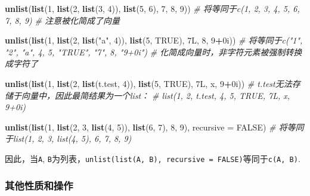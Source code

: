 \documentclass[]{book}
\newenvironment{Shaded}{\begin{snugshade}}{\end{snugshade}}
\newcommand{\CommentTok}[1]{\textcolor[rgb]{0.56,0.35,0.01}{\textit{#1}}}
\newcommand{\DataTypeTok}[1]{\textcolor[rgb]{0.13,0.29,0.53}{#1}}
\newcommand{\DecValTok}[1]{\textcolor[rgb]{0.00,0.00,0.81}{#1}}
\newcommand{\KeywordTok}[1]{\textcolor[rgb]{0.13,0.29,0.53}{\textbf{#1}}}
\newcommand{\NormalTok}[1]{#1}
\newcommand{\OperatorTok}[1]{\textcolor[rgb]{0.81,0.36,0.00}{\textbf{#1}}}
\newcommand{\OtherTok}[1]{\textcolor[rgb]{0.56,0.35,0.01}{#1}}
\newcommand{\StringTok}[1]{\textcolor[rgb]{0.31,0.60,0.02}{#1}}
\begin{document}
\begin{Shaded}
\begin{Highlighting}[]
\KeywordTok{unlist}\NormalTok{(}\KeywordTok{list}\NormalTok{(}\DecValTok{1}\NormalTok{, }\KeywordTok{list}\NormalTok{(}\DecValTok{2}\NormalTok{, }\KeywordTok{list}\NormalTok{(}\DecValTok{3}\NormalTok{, }\DecValTok{4}\NormalTok{)), }\KeywordTok{list}\NormalTok{(}\DecValTok{5}\NormalTok{, }\DecValTok{6}\NormalTok{), }\DecValTok{7}\NormalTok{, }\DecValTok{8}\NormalTok{, }\DecValTok{9}\NormalTok{))}
\CommentTok{# 将等同于c(1, 2, 3, 4, 5, 6, 7, 8, 9) }
\CommentTok{# 注意被化简成了向量}

\KeywordTok{unlist}\NormalTok{(}\KeywordTok{list}\NormalTok{(}\DecValTok{1}\NormalTok{, }\KeywordTok{list}\NormalTok{(}\DecValTok{2}\NormalTok{, }\KeywordTok{list}\NormalTok{(}\StringTok{"a"}\NormalTok{, }\DecValTok{4}\NormalTok{)), }\KeywordTok{list}\NormalTok{(}\DecValTok{5}\NormalTok{, }\OtherTok{TRUE}\NormalTok{), 7L, }\DecValTok{8}\NormalTok{, }\DecValTok{9}\OperatorTok{+}\NormalTok{0i))}
\CommentTok{# 将等同于c("1", "2", "a", 4, 5, "TRUE", "7", 8, "9+0i")}
\CommentTok{# 化简成向量时，非字符元素被强制转换成字符了}

\KeywordTok{unlist}\NormalTok{(}\KeywordTok{list}\NormalTok{(}\DecValTok{1}\NormalTok{, }\KeywordTok{list}\NormalTok{(}\DecValTok{2}\NormalTok{, }\KeywordTok{list}\NormalTok{(t.test, }\DecValTok{4}\NormalTok{)), }\KeywordTok{list}\NormalTok{(}\DecValTok{5}\NormalTok{, }\OtherTok{TRUE}\NormalTok{), 7L, x, }\DecValTok{9}\OperatorTok{+}\NormalTok{0i))}
\CommentTok{# t.test无法存储于向量中，因此最简结果为一个list：}
\CommentTok{# list(1, 2, t.test, 4, 5, TRUE, 7L, x, 9+0i)}


\KeywordTok{unlist}\NormalTok{(}\KeywordTok{list}\NormalTok{(}\DecValTok{1}\NormalTok{, }\KeywordTok{list}\NormalTok{(}\DecValTok{2}\NormalTok{, }\DecValTok{3}\NormalTok{, }\KeywordTok{list}\NormalTok{(}\DecValTok{4}\NormalTok{, }\DecValTok{5}\NormalTok{)), }\KeywordTok{list}\NormalTok{(}\DecValTok{6}\NormalTok{, }\DecValTok{7}\NormalTok{), }\DecValTok{8}\NormalTok{, }\DecValTok{9}\NormalTok{), }\DataTypeTok{recursive =} \OtherTok{FALSE}\NormalTok{)}
\CommentTok{# 将等同于list(1, 2, 3, list(4, 5), 6, 7, 8, 9)}
\end{Highlighting}
\end{Shaded}

因此，当\texttt{A}, \texttt{B}为列表，\texttt{unlist(list(A,\ B),\ recursive\ =\ FALSE)}等同于\texttt{c(A,\ B)}.

\subsubsection{其他性质和操作}
\end{document}
